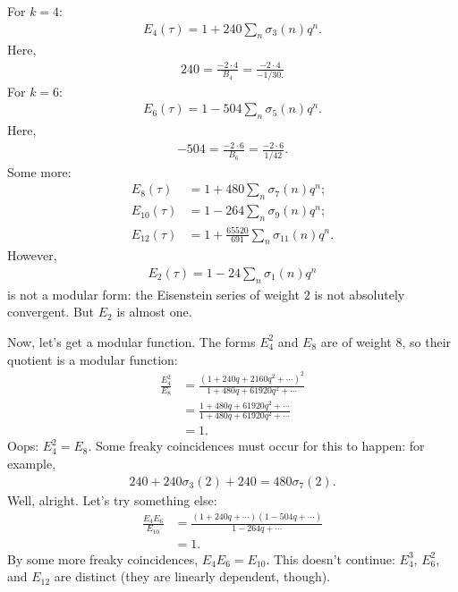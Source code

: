 \documentclass[11pt, oneside,margin=1in]{article}
\begin{document}
\begin{example}[ ]\label{}\text{}
For $k=4$:
	\begin{align*}
	E_4(\tau) = 1 +240 \sum_{n}^{} \sigma_3(n)q^n.
\end{align*}
Here,
\begin{align*}
	240 = \frac{-2 \cdot 4}{B_4} = \frac{-2\cdot 4}{-1/30.}
\end{align*}
For $k=6$:
\begin{align*}
	E_6(\tau) = 1 - 504  \sum_{n}^{} \sigma_5(n)q^n.
\end{align*}
Here,
\begin{align*}
	-504 = \frac{-2\cdot 6}{B_6} = \frac{-2\cdot 6}{1/42}.
\end{align*}
Some more:
\begin{align*}
	E_8(\tau) &= 1 + 480 \sum_{n}^{} \sigma_7(n) q^n;\\
	E_{10}(\tau) &= 1 - 264 \sum_{n}^{} \sigma_9(n) q^n;\\
	E_{12}(\tau) &= 1 + \frac{65520}{691}\sum_{n}^{} \sigma_{11}(n) q^n.
\end{align*}
However,
\begin{align*}
	E_2(\tau) = 1 -24  \sum_{n}^{} \sigma_1(n)q^n
\end{align*}
is not a modular form: the Eisenstein series of weight $2$ is not absolutely convergent. But $E_2$ is almost one.

Now, let's get a modular function. The forms $E_4^2$ and $E_8$ are of weight $8$, so their quotient is a modular function:
\begin{align*}
	\frac{E_4^2}{E_8} &= \frac{(1 + 240q + 2160q^2 + \cdots)^2}{1 + 480 q + 61920q^2+ \cdots}\\
			  &= \frac{1 + 480q + 61920q^2 + \cdots}{1 + 480q + 61920q^2 + \cdots}\\
			  &=1.
\end{align*}
Oops: $E_4^2 = E_8$. Some freaky coincidences must occur for this to happen: for example,
\begin{align*}
	240 + 240 \sigma_3(2) + 240 = 480 \sigma_7(2).
\end{align*}
Well, alright. Let's try something else:
\begin{align*}
	\frac{E_{4}E_6}{E_{10}} &= \frac{(1+240q + \cdots) (1 - 504q +  \cdots)}{1 - 264q + \cdots}\\
				&= 1.
\end{align*}
By some more freaky coincidences, $E_4E_6=E_{10}$. This doesn't continue: $E_4^3$, $E_6^2$, and $E_{12}$ are distinct (they are linearly dependent, though).


\end{example}
\end{document}
